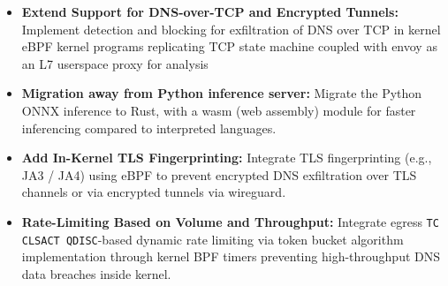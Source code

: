 \documentclass [11pt, proquest] {uwthesis}[2020/02/24]
\begin{document}
\begin{itemize}[itemsep=1pt,parsep=0pt]
  \item \textbf{Extend Support for DNS-over-TCP and Encrypted Tunnels:} Implement detection and blocking for exfiltration of DNS over TCP in kernel eBPF kernel programs replicating TCP state machine coupled with envoy as an L7 userspace proxy for analysis

  \item \textbf{Migration away from Python inference server:} Migrate the Python ONNX inference to Rust, with a wasm (web assembly) module for faster inferencing compared to interpreted languages.

  \item \textbf{Add In-Kernel TLS Fingerprinting:} Integrate TLS fingerprinting (e.g., JA3 / JA4) using eBPF to prevent encrypted DNS exfiltration over TLS channels or via encrypted tunnels via wireguard.




  \item \textbf{Rate-Limiting Based on Volume and Throughput:} Integrate egress \texttt{TC CLSACT QDISC}-based dynamic rate limiting via token bucket algorithm implementation through kernel BPF timers preventing high-throughput DNS data breaches inside kernel.


\end{itemize}
\end{document}
